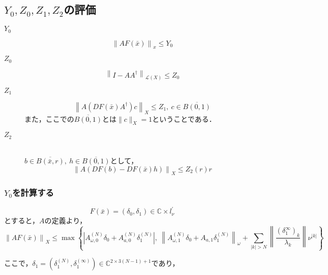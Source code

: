 \documentclass[11pt,a4paper]{jsarticle}
\theoremstyle{definition}
\begin{document}
\subsection{$Y_0,Z_0,Z_1,Z_2$の評価}
\begin{description}
  \item[$Y_0$]
    \begin{equation*}
      \left\| AF\left(\bar{x}\right)\right\|_x \leq Y_0
    \end{equation*}
  \item[$Z_0$]
    \begin{equation*}
      \left\| I-AA^\dagger \right\|_{\mathcal{L}\left(
      X
      \right)} \leq Z_0
    \end{equation*}
  \item[$Z_1$]
    \begin{equation*}
      \left\| A \left(DF \left( \bar{x} \right) A^\dagger \right) c \right\|_X \leq Z_1,\ c\in \overline{B(0,1)}
    \end{equation*}
    また，ここでの$\overline{B(0,1)}$とは$\|c\|_X=1$ということである．
  \item[$Z_2$]
    \quad \\
    $b\in \overline{B\left(\bar{x},r\right)},\ h\in \overline{B(0,1)}$として，
    \begin{equation*}
      \left\| A \left(DF \left( b \right) - DF \left( \bar{x} \right) h \right) \right\|_{X} \leq Z_2 (r)r
    \end{equation*}
\end{description}

\subsubsection{$Y_0$を計算する}
\begin{equation*}
  F(\bar{x}) = (\delta_0, \delta_1) \in \mathbb{C}\times l_\nu^\prime
\end{equation*}
とすると，$A$の定義より，
\begin{equation*}
  \left\| AF(\bar{x}) \right\|_X \leq \max \left\{ \left| A_{\omega, 0}^{(N)} \delta_0 + A_{a,0}^{(N)} \delta_1^{(N)} \right|,\  \left\| A_{\omega,1}^{(N)} \delta_0 + A_{a,1} \delta_1^{(N)} \right\|_\omega + \sum_{|k|>N} \left\| \frac{\left(\delta_1^\infty\right)_k}{\lambda_k}  \right\| \nu^{|k|} \right\}
\end{equation*}

ここで，$\delta_1 = \left( \delta_1^{(N)}, \delta_1^{(\infty)} \right) \in \mathbb{C}^{2 \times 3(N-1)+1}$であり，
\end{document}
